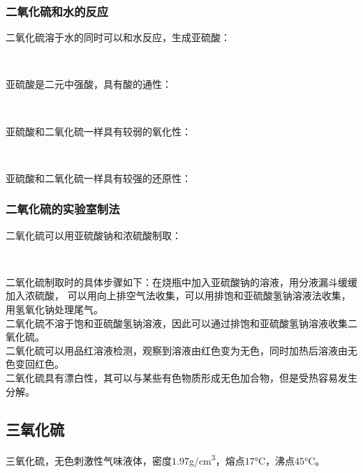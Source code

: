 \documentclass[UTF8]{ctexart}
\begin{document}
\newpage

\subsubsection{二氧化硫和水的反应}
    二氧化硫溶于水的同时可以和水反应，生成亚硫酸：
    \begin{center}
        \\[6mm]
    \end{center}
    亚硫酸是二元中强酸，具有酸的通性：
    \begin{center}
        \\[6mm]
    \end{center}
    亚硫酸和二氧化硫一样具有较弱的氧化性：
    \begin{center}
        \\[6mm]
    \end{center}
    亚硫酸和二氧化硫一样具有较强的还原性：
    \begin{center}
    \end{center}

\subsubsection{二氧化硫的实验室制法}
    二氧化硫可以用亚硫酸钠和浓硫酸制取：
    \begin{center}
        \\[6mm]
    \end{center}
    二氧化硫制取时的具体步骤如下：在烧瓶中加入亚硫酸钠的溶液，用分液漏斗缓缓加入浓硫酸，
    可以用向上排空气法收集，可以用排饱和亚硫酸氢钠溶液法收集，用氢氧化钠处理尾气。\\[3mm]
    二氧化硫不溶于饱和亚硫酸氢钠溶液，因此可以通过排饱和亚硫酸氢钠溶液收集二氧化硫。\\[3mm]
    二氧化硫可以用品红溶液检测，观察到溶液由红色变为无色，同时加热后溶液由无色变回红色。\\[3mm]
    二氧化硫具有漂白性，其可以与某些有色物质形成无色加合物，但是受热容易发生分解。

\subsection{三氧化硫}
    三氧化硫，无色刺激性气味液体，密度$1.97$\si{g/cm^3}，熔点$17$\si{\degreeCelsius}，沸点$45$\si{\degreeCelsius}。
\end{document}
